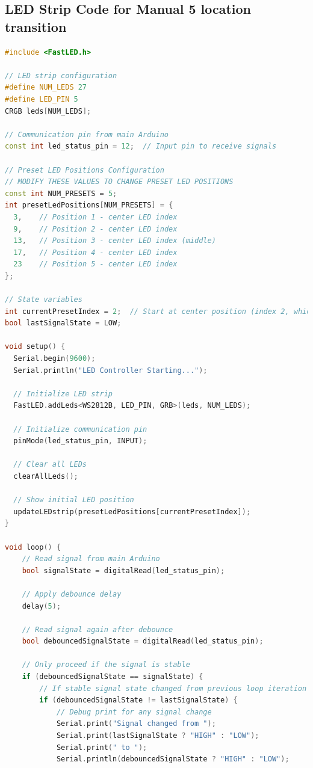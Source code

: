 \subsection{LED Strip Code for Manual 5 location transition}
\begin{lstlisting}[style=cstyle, caption=Cpp Code of the RGB strip with Manual 5 locations, label=lst:RGBcodeManual, language=c++ ]
    #include <FastLED.h>

// LED strip configuration
#define NUM_LEDS 27
#define LED_PIN 5
CRGB leds[NUM_LEDS];

// Communication pin from main Arduino
const int led_status_pin = 12;  // Input pin to receive signals

// Preset LED Positions Configuration
// MODIFY THESE VALUES TO CHANGE PRESET LED POSITIONS
const int NUM_PRESETS = 5;
int presetLedPositions[NUM_PRESETS] = {
  3,    // Position 1 - center LED index
  9,    // Position 2 - center LED index
  13,   // Position 3 - center LED index (middle)
  17,   // Position 4 - center LED index
  23    // Position 5 - center LED index
};

// State variables
int currentPresetIndex = 2;  // Start at center position (index 2, which is the 3rd preset)
bool lastSignalState = LOW;

void setup() {
  Serial.begin(9600);
  Serial.println("LED Controller Starting...");
  
  // Initialize LED strip
  FastLED.addLeds<WS2812B, LED_PIN, GRB>(leds, NUM_LEDS);
  
  // Initialize communication pin
  pinMode(led_status_pin, INPUT);
  
  // Clear all LEDs
  clearAllLeds();
  
  // Show initial LED position
  updateLEDstrip(presetLedPositions[currentPresetIndex]);
}

void loop() {
    // Read signal from main Arduino
    bool signalState = digitalRead(led_status_pin);

    // Apply debounce delay
    delay(5);

    // Read signal again after debounce
    bool debouncedSignalState = digitalRead(led_status_pin);

    // Only proceed if the signal is stable
    if (debouncedSignalState == signalState) {
        // If stable signal state changed from previous loop iteration
        if (debouncedSignalState != lastSignalState) {
            // Debug print for any signal change
            Serial.print("Signal changed from ");
            Serial.print(lastSignalState ? "HIGH" : "LOW");
            Serial.print(" to ");
            Serial.println(debouncedSignalState ? "HIGH" : "LOW");
            

\end{lstlisting}
